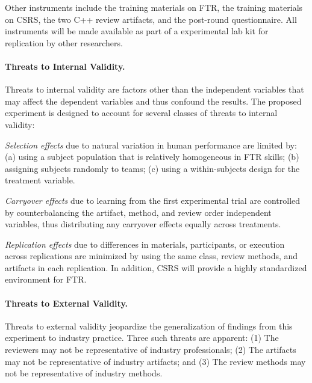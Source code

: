 Other instruments include the training materials on FTR, the training
materials on CSRS, the two C++ review artifacts, and the post-round
questionnaire.  All instruments will be made available as part of a
experimental lab kit for replication by other researchers. 

\paragraph {Threats to Internal Validity.}

Threats to internal validity are factors other than the independent
variables that may affect the dependent variables and thus confound the
results.  The proposed experiment is designed to account for several
classes of threats to internal validity:

\begin{itemizenoindent}

\item {\em Selection effects} due to natural variation in human performance
  are limited by: (a) using a subject population that is relatively
  homogeneous in FTR skills; (b) assigning subjects randomly to teams; (c)
  using a within-subjects design for the treatment variable.

\item {\em Carryover effects} due to learning from the first experimental
  trial are controlled by counterbalancing the artifact, method, and
  review order independent variables, thus distributing any carryover
  effects equally across treatments.

\item {\em Replication effects} due to differences in materials,
  participants, or execution across replications are minimized by using the
  same class, review methods, and artifacts in each replication. In
  addition, CSRS will provide a highly standardized environment for FTR.

\end{itemizenoindent}

\paragraph {Threats to External Validity.}

Threats to external validity jeopardize the generalization of findings from
this experiment to industry practice. Three such threats are apparent: (1)
The reviewers may not be representative of industry professionals; (2) The
artifacts may not be representative of industry artifacts; and (3) The
review methods may not be representative of industry methods.

